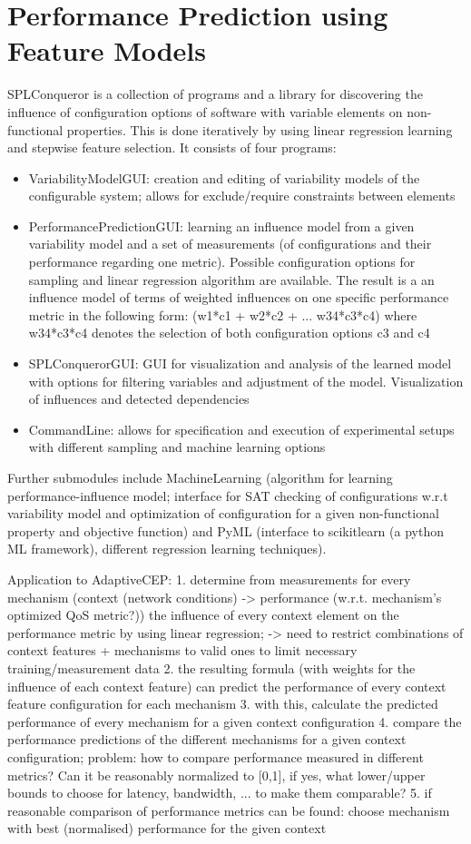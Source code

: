 \section{Performance Prediction using Feature Models}
SPLConqueror is a collection of programs and a library for discovering the influence of configuration options of software with variable elements on non-functional properties. This is done iteratively by using linear regression learning and stepwise feature selection. It consists of four programs: 
\begin{itemize}
\item VariabilityModelGUI: creation and editing of variability models of the configurable system; allows for exclude/require constraints between elements
\item PerformancePredictionGUI: learning an influence model from a given variability model and a set of measurements (of configurations and their performance regarding one metric). Possible configuration options for sampling and linear regression algorithm are available. The result is a an influence model of terms of weighted influences on one specific performance metric in the following form: (w1*c1 + w2*c2 + ... w34*c3*c4) where w34*c3*c4 denotes the selection of both configuration options c3 and c4
\item SPLConquerorGUI: GUI for visualization and analysis of the learned model with options for filtering variables and adjustment of the model. Visualization of influences and detected dependencies
\item CommandLine: allows for specification and execution of experimental setups with different sampling and machine learning options
\end{itemize}
 Further submodules include MachineLearning (algorithm for learning performance-influence model; interface for SAT checking of configurations w.r.t variability model and optimization of configuration for a given non-functional property and objective function) and PyML (interface to scikitlearn (a python ML framework), different regression learning techniques).
 
 Application to AdaptiveCEP: 
 1. determine from measurements for every mechanism (context (network conditions) -> performance (w.r.t. mechanism's optimized QoS metric?)) the influence of every context element on the performance metric by using linear regression; -> need to restrict combinations of context features + mechanisms to valid ones to limit necessary training/measurement data 
 2. the resulting formula (with weights for the influence of each context feature) can predict the performance of every context feature configuration for each mechanism 
 3. with this, calculate the predicted performance of every mechanism for a given context configuration
 4. compare the performance predictions of the different mechanisms for a given context configuration; problem: how to compare performance measured in different metrics? Can it be reasonably normalized to [0,1], if yes, what lower/upper bounds to choose for latency, bandwidth, ... to make them comparable?
 5. if reasonable comparison of performance metrics can be found: choose mechanism with best (normalised) performance for the given context

